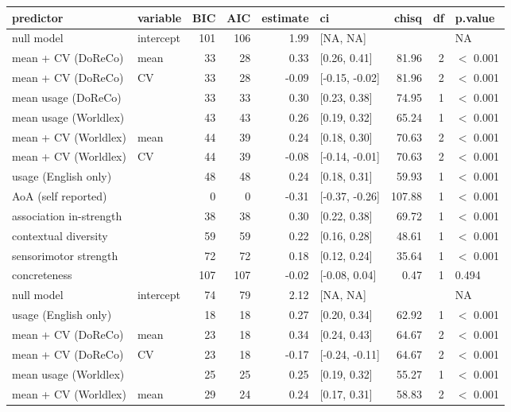 \begin{table}[ht]
\centering
\begin{tabular}{llrrrlrrl}
  \hline
predictor & variable & BIC & AIC & estimate & ci & chisq & df & p.value \\ 
  \hline
null model & intercept & 101 & 106 & 1.99 & [NA, NA] &  &  & NA \\ 
  mean + CV (DoReCo) & mean & 33 & 28 & 0.33 & [0.26, 0.41] & 81.96 & 2 & $<$ 0.001 \\ 
  mean + CV (DoReCo) & CV & 33 & 28 & -0.09 & [-0.15, -0.02] & 81.96 & 2 & $<$ 0.001 \\ 
  mean usage (DoReCo) &  & 33 & 33 & 0.30 & [0.23, 0.38] & 74.95 & 1 & $<$ 0.001 \\ 
  mean usage (Worldlex) &  & 43 & 43 & 0.26 & [0.19, 0.32] & 65.24 & 1 & $<$ 0.001 \\ 
  mean + CV (Worldlex) & mean & 44 & 39 & 0.24 & [0.18, 0.30] & 70.63 & 2 & $<$ 0.001 \\ 
  mean + CV (Worldlex) & CV & 44 & 39 & -0.08 & [-0.14, -0.01] & 70.63 & 2 & $<$ 0.001 \\ 
  usage (English only) &  & 48 & 48 & 0.24 & [0.18, 0.31] & 59.93 & 1 & $<$ 0.001 \\ 
  AoA (self reported) &  & 0 & 0 & -0.31 & [-0.37, -0.26] & 107.88 & 1 & $<$ 0.001 \\ 
  association in-strength &  & 38 & 38 & 0.30 & [0.22, 0.38] & 69.72 & 1 & $<$ 0.001 \\ 
  contextual diversity &  & 59 & 59 & 0.22 & [0.16, 0.28] & 48.61 & 1 & $<$ 0.001 \\ 
  sensorimotor strength &  & 72 & 72 & 0.18 & [0.12, 0.24] & 35.64 & 1 & $<$ 0.001 \\ 
  concreteness &  & 107 & 107 & -0.02 & [-0.08, 0.04] & 0.47 & 1 & 0.494 \\ 
  null model & intercept & 74 & 79 & 2.12 & [NA, NA] &  &  & NA \\ 
  usage (English only) &  & 18 & 18 & 0.27 & [0.20, 0.34] & 62.92 & 1 & $<$ 0.001 \\ 
  mean + CV (DoReCo) & mean & 23 & 18 & 0.34 & [0.24, 0.43] & 64.67 & 2 & $<$ 0.001 \\ 
  mean + CV (DoReCo) & CV & 23 & 18 & -0.17 & [-0.24, -0.11] & 64.67 & 2 & $<$ 0.001 \\ 
  mean usage (Worldlex) &  & 25 & 25 & 0.25 & [0.19, 0.32] & 55.27 & 1 & $<$ 0.001 \\ 
  mean + CV (Worldlex) & mean & 29 & 24 & 0.24 & [0.17, 0.31] & 58.83 & 2 & $<$ 0.001 \\ 

\end{tabular}
\end{table}
